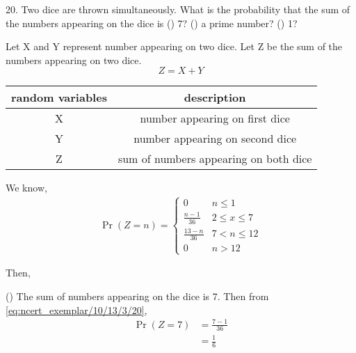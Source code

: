 \documentclass[]{article}
\begin{document}
\providecommand{\qfunc}[1]{\ensuremath{Q\left(#1\right)}}
\providecommand{\gauss}[2]{\mathcal{N}\ensuremath{\left(#1,#2\right)}}
\providecommand{\diff}[2]{\ensuremath{\frac{d{#1}}{d{#2}}}}
\providecommand{\myceil}[1]{\left \lceil #1 \right \rceil }
\newcommand\figref{Fig.~\ref}
\newcommand\tabref{Table~\ref}
\newcommand{\sinc}{\,\text{sinc}\,}
\newcommand{\rect}{\,\text{rect}\,}

\let\vec\mathbf

20. Two dice are thrown simultaneously. What is the probability that the sum of the numbers appearing on the dice is () 7? () a prime number? () 1?

\solution Let X and Y represent number appearing on two dice. Let Z be the sum of the numbers appearing on two dice.
$$Z=X+Y$$

\begin{table}[H]
\centering
\begin{tabular}{|c|c|}
\hline
random variables & description \\
\hline
X & number appearing on first dice \\
\hline
Y & number appearing on second dice \\
\hline
Z & sum of numbers appearing on both dice \\
\hline
\end{tabular}
\label{tab:ncert_exemplar/10/13/3/20}
\end{table}

 We know,
\begin{align}
\Pr(Z=n) = 
\begin{cases}
0 &  n \leq{1} \\
\frac{n-1}{36} &  2 \leq{x} \leq{7} \\
\frac{13-n}{36} &  7 < n \leq{12} \\
0 &  n>12
\label{eq:ncert_exemplar/10/13/3/20}
\end{cases}
\end{align}

Then,

() The sum of numbers appearing on the dice is 7. Then from \eqref{eq:ncert_exemplar/10/13/3/20},
\begin{align}
\Pr(Z=7) &= \frac{7-1}{36} \\
&= \frac{1}{6}
\end{align}
\end{document}
